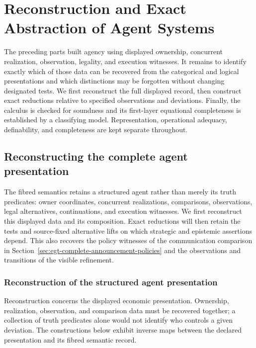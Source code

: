 \documentclass[11pt,a4paper]{article}
\numberwithin{equation}{section}
\theoremstyle{definition}
\theoremstyle{remark}
\theoremstyle{plain}
\begin{document}
\section{Reconstruction and Exact Abstraction of Agent Systems}\label{sec:paper-14}

The preceding parts built agency using displayed ownership,
concurrent realization, observation, legality, and execution witnesses.
It remains to identify exactly which of those data can be recovered
from the categorical and logical presentations and which distinctions
may be forgotten without changing designated tests. We first reconstruct
the full displayed record, then construct exact reductions relative to
specified observations and deviations. Finally, the calculus is checked
for soundness and its first-layer equational completeness is established
by a classifying model. Representation, operational adequacy,
definability, and completeness are kept separate throughout.

\subsection{Reconstructing the complete agent presentation}
\label{sec:egt-abstraction}
\label{sec:egt-reduction}

The fibred semantics retains a structured agent rather than merely
its truth predicates: owner coordinates, concurrent realizations,
comparisons, observations, legal alternatives, continuations, and
execution witnesses. We first reconstruct this displayed data and its
composition. Exact reductions will then retain the tests and
source-fixed alternative lifts on which strategic and epistemic
assertions depend. This also recovers the policy witnesses of the
communication comparison in
Section~\ref{sec:egt-complete-announcement-policies}
and the observations and transitions of the visible refinement.

\subsubsection{Reconstruction of the structured agent presentation}

Reconstruction concerns the displayed economic presentation.
Ownership, realization, observation, and comparison data must be
recovered together; a collection of truth predicates alone would
not identify who controls a given deviation. The constructions below
exhibit inverse maps between the declared presentation and its
fibred semantic record.
\end{document}
